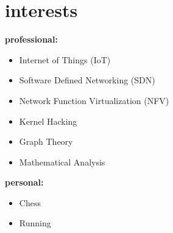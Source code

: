 \documentclass[]{friggeri-cv} %
\begin{document}
\section{interests}
\textbf{professional:}
\begin{itemize}
	\item Internet of Things (IoT)
	\item Software Defined Networking (SDN)
	\item Network Function Virtualization (NFV)
	\item Kernel Hacking
	\item Graph Theory
	\item Mathematical Analysis
\end{itemize}
\textbf{personal:}
\begin{itemize}	
	\item Chess
	\item Running
\end{itemize}
\end{document}

